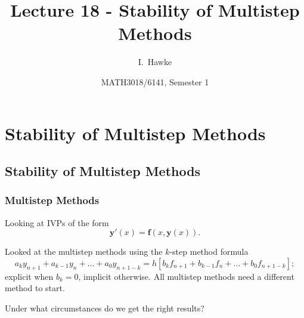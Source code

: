 \documentclass{beamer}
\title[Lecture 18] %
{Lecture 18 - Stability of Multistep Methods}
\author[I. Hawke] %
{I.~Hawke}
\institute[University of Southampton] %
{
  School of Mathematics, \\
  University of Southampton, UK
}
\date[Semester 1] %
{MATH3018/6141, Semester 1}
\newcommand{\by}{{\boldsymbol{y}}}
\newcommand{\bfm}[1]{{\boldsymbol{#1}}}
\begin{document}
\begin{frame}
  \titlepage
\end{frame}

\section{Stability of Multistep Methods}

\subsection{Stability of Multistep Methods}

\begin{frame}
  \frametitle{Multistep Methods}

  Looking at IVPs of the form
  \begin{equation*}
    \by'(x) = \bfm{f}(x, \by(x)).
  \end{equation*} \pause

  Looked at the multistep methods using the $k$-step method formula
  \begin{equation*}
    a_k y_{n+1} + a_{k-1} y_n + \dots + a_0 y_{n+1-k} = h \left[ b_k
      f_{n+1} + b_{k-1} f_n + \dots + b_0 f_{n+1-k} \right];
  \end{equation*}
  explicit when $b_k = 0$, implicit otherwise. All multistep methods
  need a different method to start. \pause

  \vspace{1ex}

  Under what circumstances do we get the right results?

\end{frame}
\end{document}

